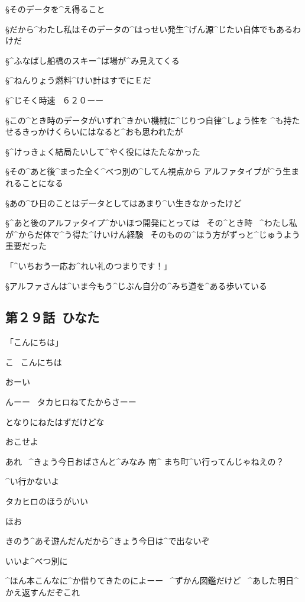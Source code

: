 \S そのデータを^{え}{得}ること

\S だから^{わたし}{私}はそのデータの^{はっせい}{発生}^{げん}{源}^{じたい}{自体}でもあるわけだ

\page
\S ^{ふなばし}{船橋}のスキー^{ば}{場}が^{み}{見}えてくる

\S ^{ねんりょう}{燃料}^{けい}{計}はすでにＥだ

\S ^{じそく}{時速}
\ ６２０ーー

\page[74]
\S この^{とき}{時}のデータがいずれ^{きかい}{機械}に^{じりつ}{自律}^{しょう}{性}を
^{も}{持}たせるきっかけくらいにはなると^{おも}{思}われたが

\S ^{けっきょく}{結局}たいして^{やく}{役}にはたたなかった

\S その^{あと}{後}^{まった}{全}く^{べつ}{別}の^{してん}{視点}から
アルファタイプが^{う}{生}まれることになる

\page
\S あの^{ひ}{日}のことはデータとしてはあまり^{い}{生}きなかったけど

\S ^{あと}{後}のアルファタイプ^{かいほつ}{開発}にとっては
\ その^{とき}{時}
\ ^{わたし}{私}が^{からだ}{体}で^{う}{得}た^{けいけん}{経験}
\ そのものの^{ほう}{方}がずっと^{じゅうよう}{重要}だった

\page
\A 「^{いちおう}{一応}お^{れい}{礼}のつまりです！」

\S アルファさんは^{いま}{今}もう^{じぶん}{自分}の^{みち}{道}を^{ある}{歩}いている


\subsection{第２９話\ ひなた}

\page[80]
\K 「こんにちは」

\T こ
\ こんにちは

\A おーい

\page[82]
\M んーー
\ タカヒロねてたからさーー

\M となりにねたはずだけどな

\T おこせよ

\page
\T あれ
\ ^{きょう}{今日}おばさんと^{みなみ }{南}^{ まち}{町}^{い}{行}ってんじゃねえの？

\M ^{い}{行}かないよ

\M タカヒロのほうがいい

\T ほお

\T きのう^{あそ}{遊}んだんだから^{きょう}{今日}は^{で}{出}ないぞ

\M いいよ^{べつ}{別}に

\M ^{ほん}{本}こんなに^{か}{借}りてきたのによーー
\ ^{ずかん}{図鑑}だけど
\ ^{あした}{明日}^{かえ}{返}すんだぞこれ

